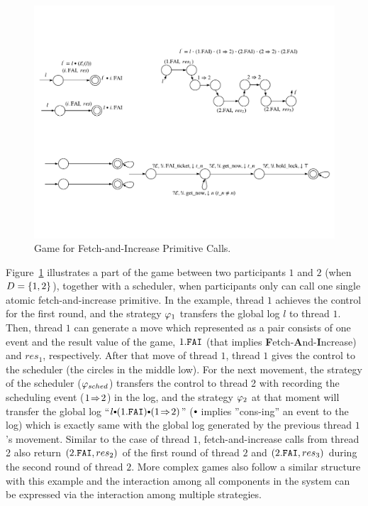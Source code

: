 \begin{figure}
\begin{center}
\includegraphics[scale=.8]{figs/ccal/faiexample}
\end{center}%
\caption{Game for Fetch-and-Increase Primitive Calls.}
\label{fig:chapter:ccal:game-for-fetch-and-increase-primitive-call}
\end{figure}

Figure~\ref{fig:chapter:ccal:game-for-fetch-and-increase-primitive-call} illustrates 
a part of the game between two participants $1$ and $2$ (when $D = \{1, 2\}$), together with a scheduler,
when participants only can call one single atomic fetch-and-increase primitive.
In the example, thread $1$ achieves the control for the first round,
and the strategy  $\varphi_{1}$ transfers the global log $l$  to thread $1$. 
Then, thread $1$ can generate a move which represented as a pair consists of one event and the result value of the game,
$1.{\mathrm{\texttt{FAI}}}$ (that implies \textbf{F}etch-\textbf{A}nd-\textbf{I}ncrease) and $res_1$, respectively.
After that move of thread $1$, thread $1$ gives the control to the scheduler (the circles in the middle low).
For the next movement, the strategy of the scheduler  ($\varphi_{sched}$)  transfers the control 
to thread 2 with recording the scheduling event ($1 \!\Rightarrow\! 2$) in the log,
and the strategy  $\varphi_{2}$ at that moment will transfer the global log ``$l \cons (1.\incticket) \cons (1 \switch 2)$'' ($\cons$ implies ''cons-ing'' an event to the log)
which is exactly same with the global log generated by the previous thread $1$'s movement.
Similar to the case of thread $1$, fetch-and-increase calls from thread 2 also return $(2.{\mathrm{\texttt{FAI}}}, res_2)$ of the first round of thread $2$
and $(2.{\mathrm{\texttt{FAI}}}, res_3)$ during the second round of thread $2$. 
More complex games also follow a similar structure with this example and the interaction among all components in the system 
can be expressed via the interaction among multiple strategies.

